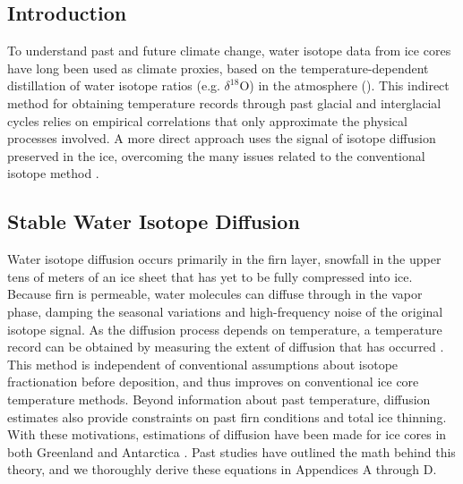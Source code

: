 \documentclass[draft, jgrga]{AGUTeX}
\begin{document}


\begin{article}

\section{Introduction}

To understand past and future climate change, water isotope data from ice cores have long been used as climate proxies, based on the temperature-dependent distillation of water isotope ratios (e.g. $\delta^{18}\mathrm{O}$) in the atmosphere (\citep{Epstein1951,Dansgaard1954,Dansgaard1964}). This indirect method for obtaining temperature records through past glacial and interglacial cycles relies on empirical correlations that only approximate the physical processes involved. A more direct approach uses the signal of isotope diffusion preserved in the ice, overcoming the many issues related to the conventional
isotope method \citep{Johnsen2000}.

\subsection{Stable Water Isotope Diffusion}

Water isotope diffusion occurs primarily in the firn layer, snowfall in the upper tens of meters of an ice sheet that has yet to be fully compressed into ice. Because firn is permeable, water molecules can diffuse through in the vapor phase, damping the seasonal variations and high-frequency noise of the original isotope signal. As the diffusion process depends on temperature, a temperature record can be obtained by measuring the extent of diffusion that has occurred \citep{Johnsen2000}. This method is independent of conventional assumptions about isotope fractionation before deposition, and thus improves on conventional ice core temperature methods. Beyond information about past temperature, diffusion estimates also provide constraints on past firn conditions and total ice thinning. With these motivations, estimations of diffusion have been made for ice cores in both Greenland and Antarctica \citep{Simonsen2011,Gkinis2014,vanderWel2015,Jones2017a}. Past studies have outlined the math behind this theory, and we thoroughly derive these equations in Appendices A through D.


\end{article}
\end{document}
